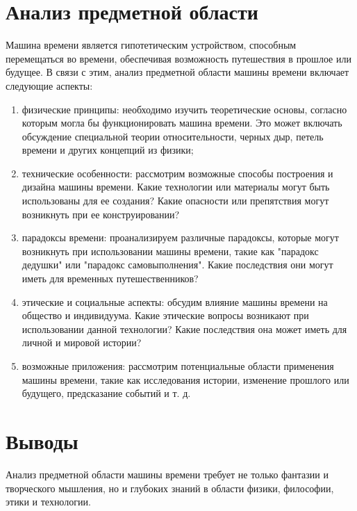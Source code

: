 
\section{Анализ предметной области}

Машина времени является гипотетическим устройством, способным перемещаться во времени, обеспечивая возможность путешествия в прошлое или будущее. В связи с этим, анализ предметной области машины времени включает следующие аспекты:


\begin{enumerate}
	\item физические принципы: необходимо изучить теоретические основы, согласно которым могла бы функционировать машина времени. Это может включать обсуждение специальной теории относительности, черных дыр, петель времени и других концепций из физики;

	\item технические особенности: рассмотрим возможные способы построения и дизайна машины времени. Какие технологии или материалы могут быть использованы для ее создания? Какие опасности или препятствия могут возникнуть при ее конструировании?

	\item парадоксы времени: проанализируем различные парадоксы, которые могут возникнуть при использовании машины времени, такие как "парадокс дедушки" или "парадокс самовыполнения". Какие последствия они могут иметь для временных путешественников?

	\item этические и социальные аспекты: обсудим влияние машины времени на общество и индивидуума. Какие этические вопросы возникают при использовании данной технологии? Какие последствия она может иметь для личной и мировой истории?

	\item возможные приложения: рассмотрим потенциальные области применения машины времени, такие как исследования истории, изменение прошлого или будущего, предсказание событий и т. д.
\end{enumerate}


\section*{Выводы}


Анализ предметной области машины времени требует не только фантазии и творческого мышления, но и глубоких знаний в области физики, философии, этики и технологии.


